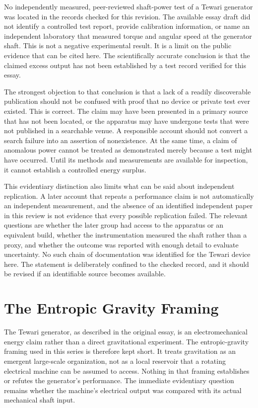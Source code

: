 \documentclass[11pt]{article}
\begin{document}
No independently measured, peer-reviewed shaft-power test of a Tewari generator was located in the records checked for this revision. The available essay draft did not identify a controlled test report, provide calibration information, or name an independent laboratory that measured torque and angular speed at the generator shaft. This is not a negative experimental result. It is a limit on the public evidence that can be cited here. The scientifically accurate conclusion is that the claimed excess output has not been established by a test record verified for this essay.

The strongest objection to that conclusion is that a lack of a readily discoverable publication should not be confused with proof that no device or private test ever existed. This is correct. The claim may have been presented in a primary source that has not been located, or the apparatus may have undergone tests that were not published in a searchable venue. A responsible account should not convert a search failure into an assertion of nonexistence. At the same time, a claim of anomalous power cannot be treated as demonstrated merely because a test might have occurred. Until its methods and measurements are available for inspection, it cannot establish a controlled energy surplus.

This evidentiary distinction also limits what can be said about independent replication. A later account that repeats a performance claim is not automatically an independent measurement, and the absence of an identified independent paper in this review is not evidence that every possible replication failed. The relevant questions are whether the later group had access to the apparatus or an equivalent build, whether the instrumentation measured the shaft rather than a proxy, and whether the outcome was reported with enough detail to evaluate uncertainty. No such chain of documentation was identified for the Tewari device here. The statement is deliberately confined to the checked record, and it should be revised if an identifiable source becomes available.

\section{The Entropic Gravity Framing}

The Tewari generator, as described in the original essay, is an electromechanical energy claim rather than a direct gravitational experiment. The entropic-gravity framing used in this series is therefore kept short. It treats gravitation as an emergent large-scale organization, not as a local reservoir that a rotating electrical machine can be assumed to access. Nothing in that framing establishes or refutes the generator's performance. The immediate evidentiary question remains whether the machine's electrical output was compared with its actual mechanical shaft input.
\end{document}
